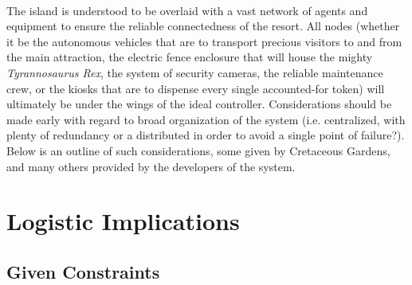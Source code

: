 \documentclass[12pt]{article}
\begin{document}
\paragraph{} The island is understood to be overlaid with a vast network of agents and equipment to
ensure the reliable connectedness of the resort. All nodes (whether it be the autonomous vehicles that are
to transport precious visitors to and from the main attraction, the electric fence enclosure that will 
house the mighty \textit{Tyrannosaurus Rex}, the system of security cameras, the reliable maintenance crew, 
or the kiosks that are to dispense every single accounted-for token) will ultimately be under the wings
of the ideal controller. Considerations should be made early with regard to broad organization of the system
(i.e. centralized, with plenty of redundancy or a distributed in order to avoid a single point of failure?).
Below is an outline of such considerations, some given by Cretaceous Gardens, and many others provided by
the developers of the system.


\section{Logistic Implications}
\paragraph{}
	\subsection{Given Constraints}
\end{document}
